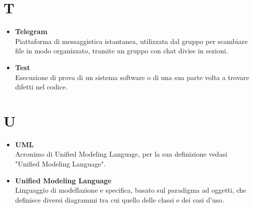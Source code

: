 \documentclass[a4paper,12pt]{article}
\begin{document}
        \section*{T} {
            \begin{itemize}
                \item \textbf{Telegram}\\
                    Piattaforma di messaggistica istantanea, utilizzata dal gruppo per scambiare file in modo organizzato, tramite un gruppo con chat divise in sezioni.
                \item \textbf{Test}\\
                    Esecuzione di prova di un sistema software o di una sua parte volta a trovare difetti nel codice.
            \end{itemize}
        }
        \newpage

        \section*{U} {
            \begin{itemize}
                \item \textbf{UML}\\
                    Acronimo di Unified Modeling Language, per la sua definizione vedasi "Unified Modeling Language".
                \item \textbf{Unified Modeling Language}\\
                    Linguaggio di modellazione e specifica, basato sul paradigma ad oggetti, che definisce diversi diagrammi tra cui quello delle classi e dei casi d'uso.

            \end{itemize}
        }
        \newpage
\end{document}
